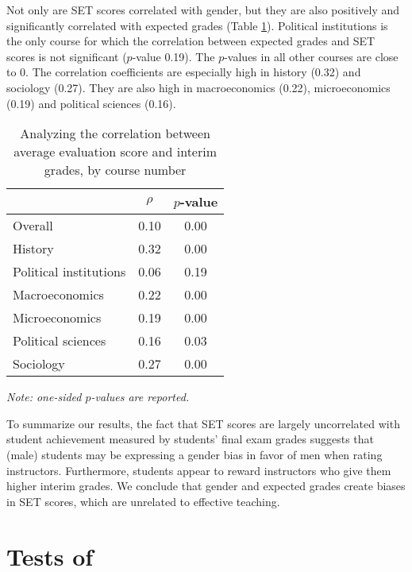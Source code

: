 \documentclass[12pt]{article}
\begin{document}
Not only are SET scores correlated with gender, but they are also positively and significantly correlated with expected grades (Table \ref{tab:instructor gender}). Political institutions is the only course for which the correlation between expected grades and SET scores is not significant ($p$-value 0.19). The $p$-values in all other courses are close to 0. The correlation coefficients are especially high in history (0.32) and sociology (0.27). They are also high in macroeconomics (0.22), microeconomics (0.19) and political sciences (0.16).



\begin{table}[htbp]
  \centering
  \footnotesize 
  \caption{Analyzing the correlation between average evaluation score and interim grades, by course number}
    \begin{tabular}{lcc}
    \toprule 
                          & $\rho$  & $p$-value  \\
   \midrule
    Overall &                 0.10       & 0.00   \\
    History &                 0.32       & 0.00   \\
    Political institutions &  0.06       & 0.19     \\
    Macroeconomics &          0.22       & 0.00    \\
    Microeconomics &          0.19       & 0.00     \\
    Political sciences &      0.16       & 0.03     \\
    Sociology &               0.27       & 0.00     \\
    \bottomrule
    \end{tabular}%
 \label{tab:instructor gender}%
  
  \textit{Note: one-sided $p$-values are reported.}
\end{table}%
\normalsize




To summarize our results, the fact that SET scores are largely uncorrelated with student achievement measured by students' final exam grades suggests that (male) students may be expressing a gender bias in favor of men when rating instructors. Furthermore, students appear to reward instructors who give them higher interim grades. We conclude that gender and expected grades create biases in SET scores, which are unrelated to effective teaching. 

\section{Tests of \citet{MacNell2014}}
\end{document}
